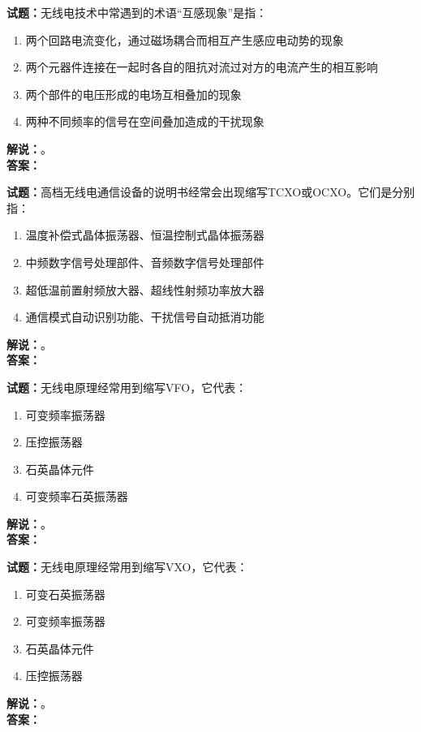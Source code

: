 \documentclass{ctexbook}
\begin{document}
\vspace{\baselineskip}

\noindent\textbf{试题：}无线电技术中常遇到的术语“互感现象”是指：
\begin{enumerate}[leftmargin=3em]
  \item 两个回路电流变化，通过磁场耦合而相互产生感应电动势的现象
  \item 两个元器件连接在一起时各自的阻抗对流过对方的电流产生的相互影响
  \item 两个部件的电压形成的电场互相叠加的现象
  \item 两种不同频率的信号在空间叠加造成的干扰现象
\end{enumerate}
\noindent\textbf{解说：}\textbf{}。\\\noindent\textbf{答案：}

\vspace{\baselineskip}

\noindent\textbf{试题：}高档无线电通信设备的说明书经常会出现缩写TCXO或OCXO。它们是分别指：
\begin{enumerate}[leftmargin=3em]
  \item 温度补偿式晶体振荡器、恒温控制式晶体振荡器
  \item 中频数字信号处理部件、音频数字信号处理部件
  \item 超低温前置射频放大器、超线性射频功率放大器
  \item 通信模式自动识别功能、干扰信号自动抵消功能
\end{enumerate}
\noindent\textbf{解说：}\textbf{}。\\\noindent\textbf{答案：}

\vspace{\baselineskip}

\noindent\textbf{试题：}无线电原理经常用到缩写VFO，它代表：
\begin{enumerate}[leftmargin=3em]
  \item 可变频率振荡器
  \item 压控振荡器
  \item 石英晶体元件
  \item 可变频率石英振荡器
\end{enumerate}
\noindent\textbf{解说：}\textbf{}。\\\noindent\textbf{答案：}

\vspace{\baselineskip}

\noindent\textbf{试题：}无线电原理经常用到缩写VXO，它代表：
\begin{enumerate}[leftmargin=3em]
  \item 可变石英振荡器
  \item 可变频率振荡器
  \item 石英晶体元件
  \item 压控振荡器
\end{enumerate}
\noindent\textbf{解说：}\textbf{}。\\\noindent\textbf{答案：}
\end{document}
